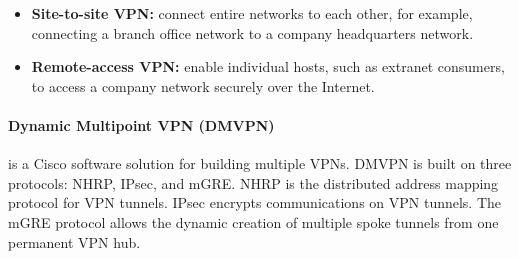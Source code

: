 \begin{itemize}
\item \textbf{Site-to-site VPN:} connect entire networks to each other, for example, connecting a branch
office network to a company headquarters network. 
\item \textbf{Remote-access VPN:} enable individual hosts, such as  extranet consumers, to access a company network securely over the Internet.
\end{itemize}

\paragraph{Dynamic Multipoint VPN (DMVPN)} is a Cisco software solution for building multiple VPNs. DMVPN is built on three protocols: NHRP, IPsec, and mGRE. NHRP is the distributed address mapping protocol for VPN tunnels. IPsec encrypts communications on VPN tunnels. The mGRE protocol allows the dynamic creation of multiple spoke tunnels from one permanent VPN hub.